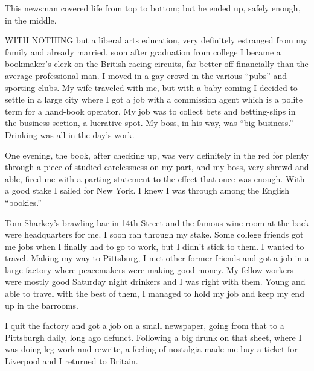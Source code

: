
\bbChapterPreamble


\begin{biblechapter}
    This newsman covered life from top to bottom; 
    but he ended up, safely enough, in the middle.
\end{biblechapter}


\begin{biblechapter}
    WITH NOTHING but a liberal arts education, 
    very definitely estranged from my family and already married, 
    soon after graduation from college 
    I became a bookmaker’s clerk on the British racing circuits, 
    far better off financially than the average professional man.
\verse I moved in a gay crowd in the various “pubs” and sporting clubs.
\verse My wife traveled with me, 
    but with a baby coming I decided to settle 
    in a large city where I got a job with a commission agent 
    which is a polite term for a hand-book operator.
\verse My job was to collect bets and betting-slips 
    in the business section, 
    a lucrative spot.
\verse My boss, in his way, was “big business.”
\verse Drinking was all in the day’s work.

\verse One evening, the book, after checking up, was very definitely in the red for plenty through a piece of studied carelessness on my part, and my boss, very shrewd and able, fired me with a parting statement to the effect that once was enough. With a good stake I sailed for New York. I knew I was through among the English “bookies.”

Tom Sharkey’s brawling bar in 14th Street and the famous wine-room at the back were headquarters for me. I soon ran through my stake. Some college friends got me jobs when I finally had to go to work, but I didn’t stick to them. I wanted to travel. Making my way to Pittsburg, I met other former friends and got a job in a large factory where peacemakers were making good money. My fellow-workers were mostly good Saturday night drinkers and I was right with them. Young and able to travel with the best of them, I managed to hold my job and keep my end up in the barrooms.

I quit the factory and got a job on a small newspaper, going from that to a Pittsburgh daily, long ago defunct. Following a big drunk on that sheet, where I was doing leg-work and rewrite, a feeling of nostalgia made me buy a ticket for Liverpool and I returned to Britain.


\end{biblechapter}
